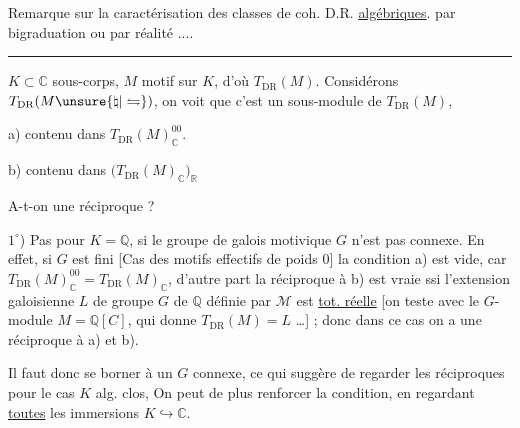 Remarque sur la caractérisation des classes de coh. D.R.  \uline{algébriques}. par bigraduation ou par réalité ....
\par\noindent\rule{\linewidth}{0.3pt}\par
$K\subset\mathbb C$ sous-corps, $M$ motif sur $K$, d'où $T_{\mathrm{DR}}(M)$. Considérons $T_{\mathrm{DR}}(M\unsure{\natural|\leftrightharpoons})$, on voit que c'est un sous-module de $T_{\mathrm{DR}}(M)$, 
\par a) contenu dans $T_{\mathrm{DR}}(M)_{\mathbb C}^{00}$.
\par b)  contenu dans $\bigl(T_{\mathrm{DR}}(M)_{\mathbb C}\bigr)_{\mathbb R}$ 

A-t-on une réciproque ?

$1^\circ$) Pas pour  $K=\mathbb Q$, si le groupe de galois motivique $G$  n'est pas connexe. En effet, si $G$ est  fini [Cas des motifs effectifs de poids 0] la condition a) est vide, car $T_{\mathrm{DR}}(M)_{\mathbb C}^{00}=T_{\mathrm{DR}}(M)_{\mathbb C}$,  d'autre part  la réciproque à b) est vraie ssi l'extension galoisienne $L$ de groupe $G$ de $\mathbb Q$ définie par $\mathcal M$ est \uline{tot. réelle} [on teste avec le $G$-module $M=\mathbb Q[C]$, qui donne $T_{\mathrm{DR}}(M)=L$ \ldots] ; donc dans ce cas on a une réciproque à a) et b).

Il faut donc se borner à un $G$ connexe, ce qui suggère de regarder les réciproques pour le cas $K$ alg. clos,  On peut de plus renforcer la condition, en regardant \uline{toutes} les immersions $K\hookrightarrow\mathbb C$.

